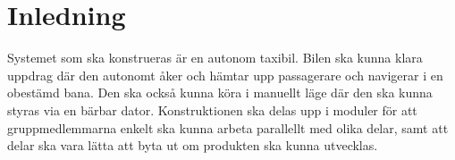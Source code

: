 \documentclass[systemskiss/skiss.tex]{subfiles}
\begin{document}
\section{Inledning}
Systemet som ska konstrueras är en autonom taxibil. Bilen ska kunna klara uppdrag där den autonomt åker och hämtar upp passagerare och navigerar i en obestämd bana. Den ska också kunna köra i manuellt läge där den ska kunna styras via en bärbar dator. Konstruktionen ska delas upp i moduler för att gruppmedlemmarna enkelt ska kunna arbeta parallellt med olika delar, samt att delar ska vara lätta att byta ut om produkten ska kunna utvecklas. 
\end{document}

